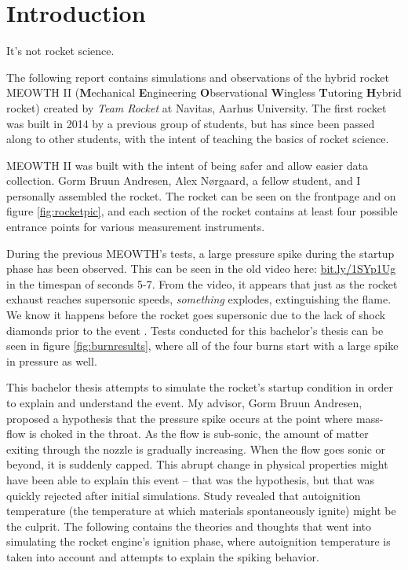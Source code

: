 \chapter{Introduction}

It's not rocket science.

The following report contains simulations and observations of the hybrid rocket MEOWTH II (\textbf{M}echanical \textbf{E}ngineering \textbf{O}bservational \textbf{W}ingless \textbf{T}utoring \textbf{H}ybrid rocket) created by \emph{Team Rocket} \cite{bulba} at Navitas, Aarhus University. The first rocket was built in 2014 by a previous group of students, but has since been passed along to other students, with the intent of teaching the basics of rocket science.

MEOWTH II was built with the intent of being safer and allow easier data collection. Gorm Bruun Andresen, Alex Nørgaard, a fellow student, and I personally assembled the rocket. The rocket can be seen on the frontpage and on figure \ref{fig:rocketpic}, and each section of the rocket contains at least four possible entrance points for various measurement instruments.

During the previous MEOWTH's tests, a large pressure spike during the startup phase has been observed. This can be seen in the old video here: \url{bit.ly/1SYp1Ug} in the timespan of seconds 5-7. From the video, it appears that just as the rocket exhaust reaches supersonic speeds, \emph{something} explodes, extinguishing the flame. We know it happens before the rocket goes supersonic due to the lack of shock diamonds prior to the event \cite{rockProp}. Tests conducted for this bachelor's thesis can be seen in figure \ref{fig:burnresults}, where all of the four burns start with a large spike in pressure as well.


This bachelor thesis attempts to simulate the rocket's startup condition in order to explain and understand the event. My advisor, Gorm Bruun Andresen, proposed a hypothesis that the pressure spike occurs at the point where mass-flow is choked in the throat. As the flow is sub-sonic, the amount of matter exiting through the nozzle is gradually increasing. When the flow goes sonic or beyond, it is suddenly capped. This abrupt change in physical properties might have been able to explain this event -- that was the hypothesis, but that was quickly rejected after initial simulations. Study revealed that autoignition temperature (the temperature at which materials spontaneously ignite) might be the culprit. The following contains the theories and thoughts that went into simulating the rocket engine's ignition phase, where autoignition temperature is taken into account and attempts to explain the spiking behavior.

